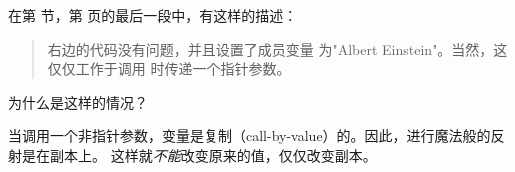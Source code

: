 \begin{Exercise}[title={指针和反射},difficulty=5]
\label{ex:pointers and reflection}
\Question
在第  节，第 \pageref{subsec:introspection and reflection} 
页的最后一段中，有这样的描述：
\begin{quote}
右边的代码没有问题，并且设置了成员变量  
为"Albert Einstein"。当然，这仅仅工作于调用  时传递一个指针参数。
\end{quote}
为什么是这样的情况？
\end{Exercise}

\begin{Answer}
\Question
当调用一个非指针参数，变量是复制（call-by-value）的。因此，进行魔法般的反射是在副本上。
这样就\emph{不能}改变原来的值，仅仅改变副本。
\end{Answer}
